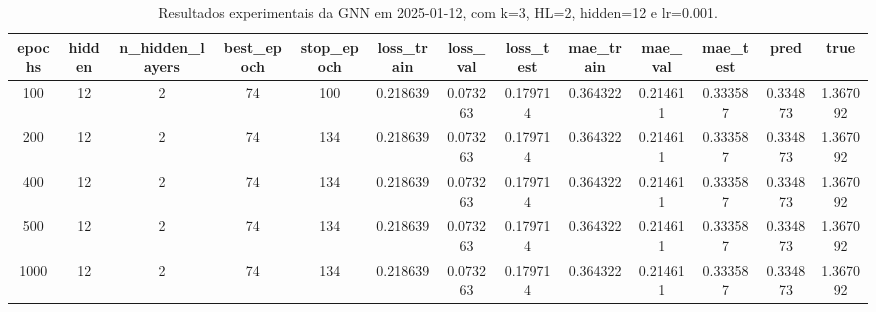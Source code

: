 \begin{table}[h]
\centering
\caption{Resultados experimentais da GNN em 2025-01-12, com k=3, HL=2, hidden=12 e lr=0.001.}
\label{tab:gnn_results_k3_hl2_h12_d20250112}
\begin{tabular}{ccccccccccccc}
\toprule
epochs & hidden & n\_hidden\_layers & best\_epoch & stop\_epoch & loss\_train & loss\_val & loss\_test & mae\_train & mae\_val & mae\_test & pred & true \\
\midrule
100 & 12 & 2 & 74 & 100 & 0.218639 & 0.073263 & 0.179714 & 0.364322 & 0.214611 & 0.333587 & 0.334873 & 1.367092 \\
200 & 12 & 2 & 74 & 134 & 0.218639 & 0.073263 & 0.179714 & 0.364322 & 0.214611 & 0.333587 & 0.334873 & 1.367092 \\
400 & 12 & 2 & 74 & 134 & 0.218639 & 0.073263 & 0.179714 & 0.364322 & 0.214611 & 0.333587 & 0.334873 & 1.367092 \\
500 & 12 & 2 & 74 & 134 & 0.218639 & 0.073263 & 0.179714 & 0.364322 & 0.214611 & 0.333587 & 0.334873 & 1.367092 \\
1000 & 12 & 2 & 74 & 134 & 0.218639 & 0.073263 & 0.179714 & 0.364322 & 0.214611 & 0.333587 & 0.334873 & 1.367092 \\
\bottomrule
\end{tabular}
\end{table}
